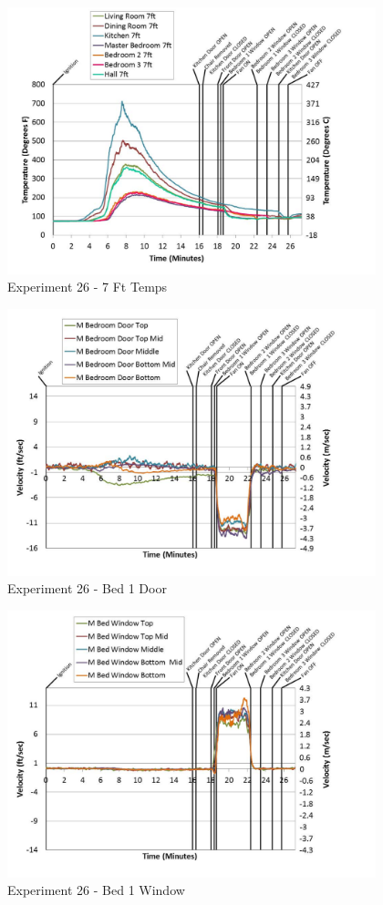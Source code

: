 \documentclass{article}
\begin{document}
\begin{appendices}
	\begin{figure}[h!]
		\centering
		\includegraphics[height=3.05in]{0_Images/Results_Charts/Exp_26_Charts/7FtTemps.pdf}
		\caption{Experiment 26 - 7 Ft Temps}
	\end{figure}
 
	\clearpage

	\begin{figure}[h!]
		\centering
		\includegraphics[height=3.05in]{0_Images/Results_Charts/Exp_26_Charts/Bed1Door.pdf}
		\caption{Experiment 26 - Bed 1 Door}
	\end{figure}
 

	\begin{figure}[h!]
		\centering
		\includegraphics[height=3.05in]{0_Images/Results_Charts/Exp_26_Charts/Bed1Window.pdf}
		\caption{Experiment 26 - Bed 1 Window}
	\end{figure}
 

\end{appendices}
\end{document}
